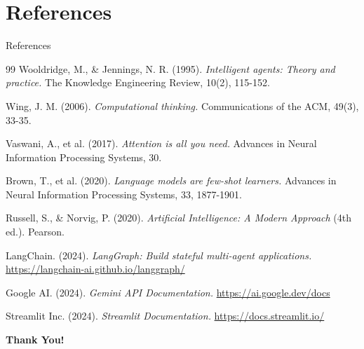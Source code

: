 \documentclass[aspectratio=169]{beamer}
\begin{document}
\section{References}
\begin{frame}[allowframebreaks]{References}
    \footnotesize
    \begin{thebibliography}{99}
        Wooldridge, M., \& Jennings, N. R. (1995). 
        \textit{Intelligent agents: Theory and practice.} 
        The Knowledge Engineering Review, 10(2), 115-152.
        
        Wing, J. M. (2006). 
        \textit{Computational thinking.} 
        Communications of the ACM, 49(3), 33-35.
        
        Vaswani, A., et al. (2017). 
        \textit{Attention is all you need.} 
        Advances in Neural Information Processing Systems, 30.
        
        Brown, T., et al. (2020). 
        \textit{Language models are few-shot learners.} 
        Advances in Neural Information Processing Systems, 33, 1877-1901.
        
        Russell, S., \& Norvig, P. (2020). 
        \textit{Artificial Intelligence: A Modern Approach} (4th ed.). 
        Pearson.
        
        LangChain. (2024). 
        \textit{LangGraph: Build stateful multi-agent applications.} 
        \url{https://langchain-ai.github.io/langgraph/}
        
        Google AI. (2024). 
        \textit{Gemini API Documentation.} 
        \url{https://ai.google.dev/docs}
        
        Streamlit Inc. (2024). 
        \textit{Streamlit Documentation.} 
        \url{https://docs.streamlit.io/}
    \end{thebibliography}
\end{frame}

\begin{frame}
    \begin{center}
        \vspace{3cm}
        {\Huge \textbf{Thank You!}}
    \end{center}
\end{frame}
\end{document}
